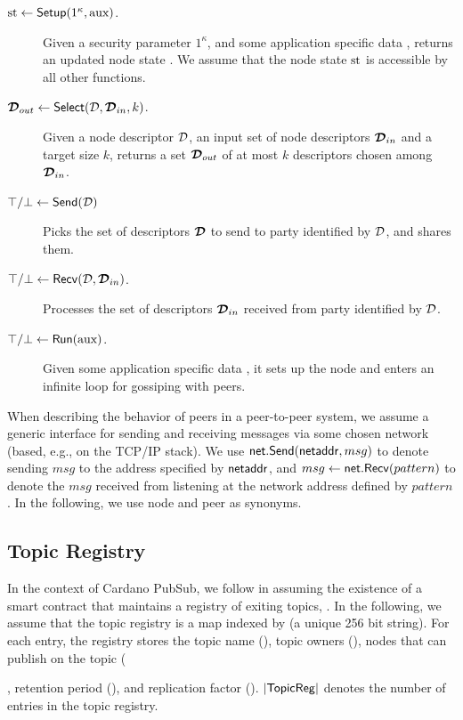 \begin{description}
\item[$\text{st} \gets \mathsf{Setup}(1^\kappa,\text{aux})$.] Given a security parameter $1^\kappa$, and some application specific data \aux, returns an updated node state \state. We assume that the node state $\text{st}$ is accessible by all other functions.
\item[$\boldsymbol{\mathcal{D}}_{out} \gets \mathsf{Select}(\mathcal{D},\boldsymbol{\mathcal{D}}_{in},k)$.] Given a node descriptor $\mathcal{D}$, an input set of node descriptors $\boldsymbol{\mathcal{D}}_{in}$ and a target size $k$, returns a set $\boldsymbol{\mathcal{D}}_{out}$ of at most $k$ descriptors chosen among $\boldsymbol{\mathcal{D}}_{in}$.
\item[$\top/\bot \gets \mathsf{Send}(\mathcal{D})$] Picks the set of descriptors $\boldsymbol{\mathcal{D}}$ to send to party identified by $\mathcal{D}$, and shares them.
\item[$\top/\bot \gets \mathsf{Recv}(\mathcal{D},\boldsymbol{\mathcal{D}}_{in})$.] Processes the set of descriptors $\boldsymbol{\mathcal{D}}_{in}$ received from party identified by $\mathcal{D}$.
\item[$\top/\bot \gets \mathsf{Run}(\text{aux})$.] Given some application specific data \aux, it sets up the node and enters an infinite loop for gossiping with peers.
\end{description}

When describing the behavior of peers in a peer-to-peer system, we assume a generic interface for sending and receiving messages via some chosen network (based, e.g., on the TCP/IP stack). We use $\mathsf{net}.\mathsf{Send}(\mathsf{netaddr},msg)$ to denote sending $msg$ to the address specified by $\mathsf{netaddr}$, and $msg \gets \mathsf{net}.\mathsf{Recv}(pattern)$ to denote the $msg$ received from listening at the network address defined by $pattern$. 
%
In the following, we use node and peer as synonyms.

\subsection{Topic Registry}
\label{ssec:topicreg}

In the context of Cardano PubSub, we follow \cite{akv24} in assuming the existence of a smart contract that maintains a registry of exiting topics, \topicReg. In the following, we assume that the topic registry is a map indexed by \topicId (a unique 256 bit string). For each \topicId entry, the registry stores the topic name (\topicname), topic owners (\owners), nodes that can publish on the topic (\publishers), retention period (\retentionPeriod), and replication factor (\replicationFactor). $|\mathsf{TopicReg}|$ denotes the number of entries in the topic registry.